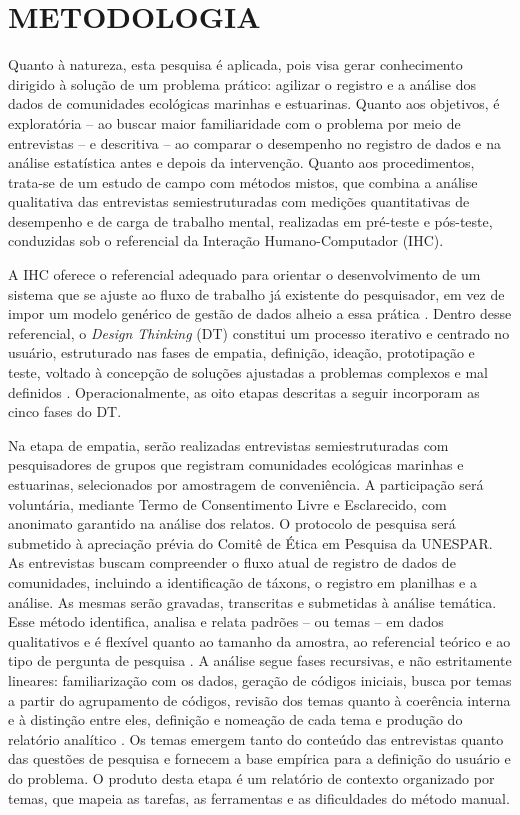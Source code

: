 \documentclass[
	12pt,				%
	oneside,			%
	a4paper,			%
	chapter=TITLE,		%
	section=TITLE,		%
	subsection=TITLE,	%
	subsubsection=TITLE,%
	english,			%
	french,				%
	spanish,			%
	brazilian,				%
	]{abntex2}
\begin{document}
\section{METODOLOGIA}
Quanto à natureza, esta pesquisa é aplicada, pois visa gerar conhecimento dirigido à solução de um problema prático: agilizar o registro e a análise dos dados de comunidades ecológicas marinhas e estuarinas. Quanto aos objetivos, é exploratória -- ao buscar maior familiaridade com o problema por meio de entrevistas -- e descritiva -- ao comparar o desempenho no registro de dados e na análise estatística antes e depois da intervenção. Quanto aos procedimentos, trata-se de um estudo de campo com métodos mistos, que combina a análise qualitativa das entrevistas semiestruturadas com medições quantitativas de desempenho e de carga de trabalho mental, realizadas em pré-teste e pós-teste, conduzidas sob o referencial da Interação Humano-Computador (IHC).

A IHC oferece o referencial adequado para orientar o desenvolvimento de um sistema que se ajuste ao fluxo de trabalho já existente do pesquisador, em vez de impor um modelo genérico de gestão de dados alheio a essa prática \cite{silva_interacao_2010}.
Dentro desse referencial, o \textit{Design Thinking} (DT) constitui um processo iterativo e centrado no usuário, estruturado nas fases de empatia, definição, ideação, prototipação e teste, voltado à concepção de soluções ajustadas a problemas complexos e mal definidos \cite{brown_design_2021}. Operacionalmente, as oito etapas descritas a seguir incorporam as cinco fases do DT.

Na etapa de empatia, serão realizadas entrevistas semiestruturadas com pesquisadores de grupos que registram comunidades ecológicas marinhas e estuarinas, selecionados por amostragem de conveniência. A participação será voluntária, mediante Termo de Consentimento Livre e Esclarecido, com anonimato garantido na análise dos relatos. O protocolo de pesquisa será submetido à apreciação prévia do Comitê de Ética em Pesquisa da UNESPAR. As entrevistas buscam compreender o fluxo atual de registro de dados de comunidades, incluindo a identificação de táxons, o registro em planilhas e a análise. As mesmas serão gravadas, transcritas e submetidas à análise temática. Esse método identifica, analisa e relata padrões -- ou temas -- em dados qualitativos e é flexível quanto ao tamanho da amostra, ao referencial teórico e ao tipo de pergunta de pesquisa \cite{braun_using_2006}. A análise segue fases recursivas, e não estritamente lineares: familiarização com os dados, geração de códigos iniciais, busca por temas a partir do agrupamento de códigos, revisão dos temas quanto à coerência interna e à distinção entre eles, definição e nomeação de cada tema e produção do relatório analítico \cite{braun_using_2006}. Os temas emergem tanto do conteúdo das entrevistas quanto das questões de pesquisa e fornecem a base empírica para a definição do usuário e do problema. O produto desta etapa é um relatório de contexto organizado por temas, que mapeia as tarefas, as ferramentas e as dificuldades do método manual.
\end{document}
